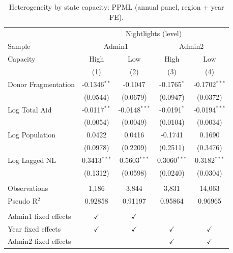 
\begin{table}[htbp]
   \caption{\label{tab:annual_ppml_cap} Heterogeneity by state capacity: PPML (annual panel, region + year FE).}
   \bigskip
   \centering
   \begin{tabular}{lcccc}
      \toprule
       & \multicolumn{4}{c}{Nightlights (level)}\\
      Sample & \multicolumn{2}{c}{Admin1} & \multicolumn{2}{c}{Admin2} \\ 
      Capacity             & High           & Low             & High           & Low \\   
                           & (1)            & (2)             & (3)            & (4)\\  
      \midrule 
      Donor Fragmentation  & -0.1346$^{**}$ & -0.1047         & -0.1765$^{*}$  & -0.1702$^{***}$\\   
                           & (0.0544)       & (0.0679)        & (0.0947)       & (0.0372)\\   
      Log Total Aid        & -0.0117$^{**}$ & -0.0148$^{***}$ & -0.0191$^{*}$  & -0.0194$^{***}$\\   
                           & (0.0054)       & (0.0049)        & (0.0104)       & (0.0034)\\   
      Log Population       & 0.0422         & 0.0416          & -0.1741        & 0.1690\\   
                           & (0.0978)       & (0.2209)        & (0.2511)       & (0.3476)\\   
      Log Lagged NL        & 0.3413$^{***}$ & 0.5603$^{***}$  & 0.3060$^{***}$ & 0.3182$^{***}$\\   
                           & (0.1312)       & (0.0598)        & (0.0240)       & (0.0304)\\   
       \\
      Observations         & 1,186          & 3,844           & 3,831          & 14,063\\  
      Pseudo R$^2$         & 0.92858        & 0.91197         & 0.95864        & 0.96965\\  
       \\
      Admin1 fixed effects & $\checkmark$   & $\checkmark$    &                & \\  
      Year fixed effects   & $\checkmark$   & $\checkmark$    & $\checkmark$   & $\checkmark$\\   
      Admin2 fixed effects &                &                 & $\checkmark$   & $\checkmark$\\   
      \bottomrule
   \end{tabular}
\end{table}


